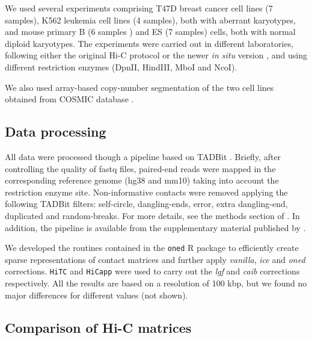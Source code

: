 \documentclass{bioinfo}
\begin{document}
\begin{methods}
We used several experiments comprising T47D breast cancer cell
lines (7 samples), K562 leukemia cell lines (4 samples), both with
aberrant karyotypes, and mouse primary B (6 samples ) and ES (7 samples)
cells, both with normal diploid karyotypes. The experiments were carried
out in different laboratories, following either the original Hi-C protocol
\citep{lieberman2009comprehensive} or the newer \textit{in situ} version
\citep{rao20143d}, and using different restriction enzymes (DpnII,
HindIII, MboI and NcoI).

We also used array-based copy-number segmentation of the two cell
lines obtained from COSMIC database \citep{forbes2010cosmic}.

\subsection{Data processing}

All data were processed though a pipeline based on TADBit
\citep{serra2016structural}. Briefly, after controlling the quality of
fastq files, paired-end reads were mapped in the corresponding reference
genome (hg38 and mm10) taking into account the restriction enzyme site.
Non-informative contacts were removed applying the following TADBit
filters: self-circle, dangling-ends, error, extra dangling-end, duplicated
and random-breaks. For more details, see the methods section of
\cite{stadhouders2017transcription}. In addition, the pipeline is
available from the supplementary material published by
\cite{quilez2017managing}.

We developed the routines contained in the \texttt{oned} R package to
efficiently create sparse representations of contact matrices and further
apply \textit{vanilla}, \textit{ice} and \textit{oned} corrections.
\texttt{HiTC} \citep{servant2012hitc} and \texttt{HiCapp}
\citep{wu2016computational} were used to carry out the \textit{lgf} and
\textit{caib} corrections respectively. All the results are based on a
resolution of 100 kbp, but we found no major differences for different
values (not shown).



\subsection{Comparison of Hi-C matrices}


\end{methods}
\end{document}
